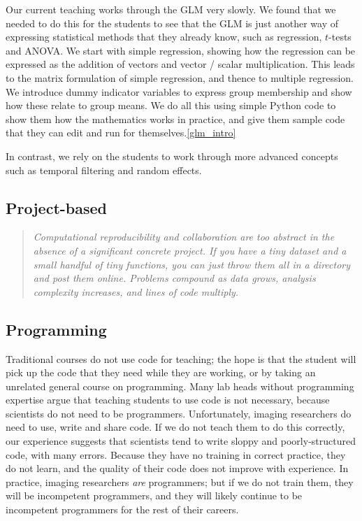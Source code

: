 Our current teaching works through the GLM very slowly. We found that we
needed to do this for the students to see that the GLM is just another way of
expressing statistical methods that they already know, such as regression,
$t$-tests and ANOVA.  We start with simple regression, showing how the
regression can be expressed as the addition of vectors and vector / scalar
multiplication.  This leads to the matrix formulation of simple regression,
and thence to multiple regression.  We introduce dummy indicator variables to
express group membership and show how these relate to group means.  We do all
this using simple Python code to show them how the mathematics works in
practice, and give them sample code that they can edit and run for themselves.\cref{glm_intro}

In contrast, we rely on the students to work through more advanced concepts
such as temporal filtering and random effects.

\subsection{Project-based}

\begin{quote}\emph{
Computational reproducibility \citep{buckheit1995wavelab} and collaboration are
too abstract in the absence of a significant concrete project.  If you have a
tiny dataset and a small handful of tiny functions, you can just throw them all
in a directory and post them online.  Problems compound as data grows, analysis
complexity increases, and lines of code multiply.
}\end{quote}


\subsection{Programming}

Traditional courses do not use code for teaching; the hope is that the student
will pick up the code that they need while they are working, or by taking an
unrelated general course on programming.  Many lab heads without programming
expertise argue that teaching students to use code is not necessary, because
scientists do not need to be programmers.  Unfortunately, imaging researchers
do need to use, write and share code.  If we do not teach them to do this
correctly, our experience suggests that scientists tend to write sloppy and
poorly-structured code, with many errors.  Because they have no training in
correct practice, they do not learn, and the quality of their code does not
improve with experience.  In practice, imaging researchers {\em are}
programmers; but if we do not train them, they will be incompetent
programmers, and they will likely continue to be incompetent programmers for
the rest of their careers.

